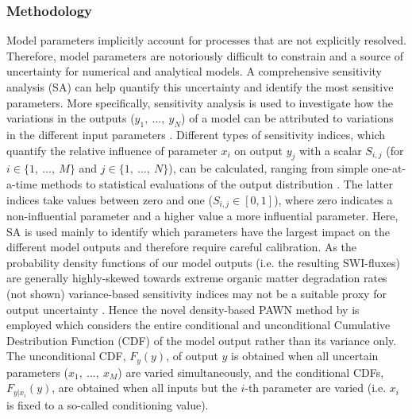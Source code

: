\documentclass[gmd, manuscript]{copernicus}
\begin{document}
\subsubsection{Methodology}
Model parameters implicitly account for processes that are not explicitly resolved. Therefore, model parameters are notoriously difficult to constrain and a source of uncertainty for numerical and analytical models. 
A comprehensive sensitivity analysis (SA) can help quantify this uncertainty and identify the most sensitive parameters. More specifically, sensitivity analysis is used to investigate how the variations in the outputs 
($y_1,\ ...,\ y_N$) of a model can be attributed to variations in the different input parameters \citep[$x_1,\ ...,\ x_M$,][]{pianosi_sensitivity_2016}. 
Different types of sensitivity indices, which quantify the relative influence of parameter $x_i$ on output $y_j$ with a scalar $S_{i,j}$ 
(for $i \in \{1,\ ...,\ M \}$ and $j \in \{1,\ ...,\ N \}$), can be calculated, ranging from simple one-at-a-time methods to statistical evaluations of the output 
distribution \citep[e.g. variance-based or density-based approaches][]{pianosi_sensitivity_2016}. The latter indices 
take values between zero and one ($S_{i,j} \in [0, 1]$), where zero indicates a non-influential parameter and a higher value a more influential parameter. 
Here, SA is used mainly to identify which parameters have the largest impact on the different model outputs and therefore require careful calibration. 
As the probability density functions of our model outputs (i.e. the resulting SWI-fluxes) are generally highly-skewed towards extreme organic matter degradation rates (not shown) variance-based sensitivity indices 
may not be a suitable proxy for output uncertainty \citep{pianosi_sensitivity_2016}. 
Hence the novel density-based PAWN method by \citet{pianosi_simple_2015} is employed which considers the entire conditional and unconditional Cumulative Destribution Function (CDF) of the model output
rather than its variance only. The unconditional CDF, $F_y(y)$, of output $y$ is obtained when all uncertain parameters ($x_1,\ ...,\ x_M$) are varied simultaneously, 
and the conditional CDFs, $F_{y|x_i}(y)$, are obtained when all inputs but the $i$-th parameter are varied (i.e. $x_i$ is fixed to a so-called conditioning value). 
\end{document}
